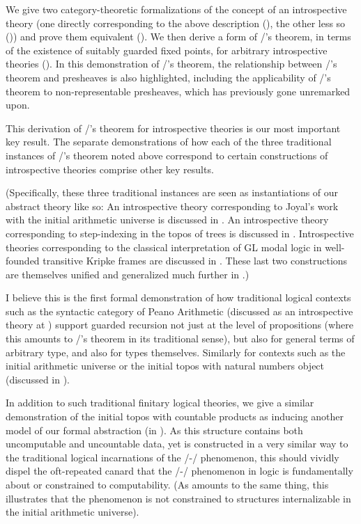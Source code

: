 We give two category-theoretic formalizations of the concept of an introspective theory (one directly corresponding to the above description (), the other less so ()) and prove them equivalent (). We then derive a form of \Loeb/'s theorem, in terms of the existence of suitably guarded fixed points, for arbitrary introspective theories (). In this demonstration of \Loeb/'s theorem, the relationship between \Loeb/'s theorem and presheaves is also highlighted, including the applicability of \Loeb/'s theorem to non-representable presheaves, which has previously gone unremarked upon.

This derivation of \Loeb/'s theorem for introspective theories is our most important key result. The separate demonstrations of how each of the three traditional instances of \Loeb/'s theorem noted above correspond to certain constructions of introspective theories comprise other key results.

(Specifically, these three traditional instances are seen as instantiations of our abstract theory like so: An introspective theory corresponding to Joyal's work with the initial arithmetic universe is discussed in . An introspective theory corresponding to step-indexing in the topos of trees is discussed in . Introspective theories corresponding to the classical interpretation of GL modal logic in well-founded transitive Kripke frames are discussed in . These last two constructions are themselves unified and generalized much further in .)

I believe this is the first formal demonstration of how traditional logical contexts such as the syntactic category of Peano Arithmetic (discussed as an introspective theory at ) support guarded recursion not just at the level of propositions (where this amounts to \Loeb/'s theorem in its traditional sense), but also for general terms of arbitrary type, and also for types themselves. Similarly for contexts such as the initial arithmetic universe or the initial topos with natural numbers object (discussed in ).

In addition to such traditional finitary logical theories, we give a similar demonstration of the initial topos with countable products as inducing another model of our formal abstraction (in ). As this structure contains both uncomputable and uncountable data, yet is constructed in a very similar way to the traditional logical incarnations of the \Godel/-\Lob/ phenomenon, this should vividly dispel the oft-repeated canard that the \Godel/-\Lob/ phenomenon in logic is fundamentally about or constrained to computability. (As amounts to the same thing, this illustrates that the phenomenon is not constrained to structures internalizable in the initial arithmetic universe).


